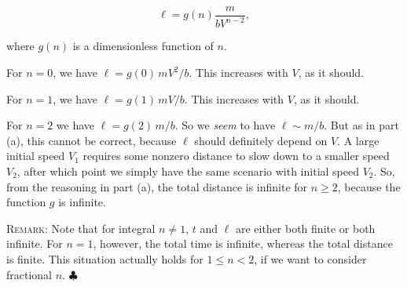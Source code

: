 \begin{equation} \ell = g(n)\frac{m}{bV^{n-2}}, \tag{1.26} \end{equation}

where $g(n)$ is a dimensionless function of $n$.

For $n = 0$, we have $\ell = g(0)\, mV^2/b$. This increases with $V$, as it should.

For $n = 1$, we have $\ell = g(1)\, mV/b$. This increases with $V$, as it should.

For $n = 2$ we have $\ell = g(2)\, m/b$. So we \textit{seem} to have $\ell \sim m/b$. But as in part (a), this cannot be correct, because $\ell$ should definitely depend on $V$. A large initial speed $V_1$ requires some nonzero distance to slow down to a smaller speed $V_2$, after which point we simply have the same scenario with initial speed $V_2$. So, from the reasoning in part (a), the total distance is infinite for $n \ge 2$, because the function $g$ is infinite.

\textsc{Remark:} Note that for integral $n \ne 1$, $t$ and $\ell$ are either both finite or both infinite. For $n = 1$, however, the total time is infinite, whereas the total distance is finite. This situation actually holds for $1 \le n < 2$, if we want to consider fractional $n$. $\clubsuit$